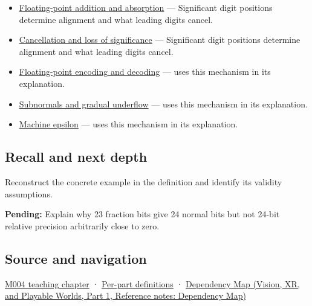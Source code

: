 \hypertarget{appendix-a24fd710cf67-used-by}{}

\begin{itemize}
\item
  \hyperref[appendix-a1b1b4580dfd]{Floating-point addition and absorption} --- Significant digit positions determine alignment and what leading digits cancel.
\item
  \hyperref[appendix-a2773a6a2f9d]{Cancellation and loss of significance} --- Significant digit positions determine alignment and what leading digits cancel.
\item
  \hyperref[appendix-6854d0e2218e]{Floating-point encoding and decoding} --- uses this mechanism in its explanation.
\item
  \hyperref[appendix-00a6e044c437]{Subnormals and gradual underflow} --- uses this mechanism in its explanation.
\item
  \hyperref[appendix-390ea641da54]{Machine epsilon} --- uses this mechanism in its explanation.
\end{itemize}

\subsection{Recall and next depth}\label{appendix-a24fd710cf67-recall-and-next-depth}

\hypertarget{appendix-a24fd710cf67-recall-and-next-depth}{}

Reconstruct the concrete example in the definition and identify its validity assumptions.

\textbf{Pending:} Explain why 23 fraction bits give 24 normal bits but not 24-bit relative precision arbitrarily close to zero.

\subsection{Source and navigation}\label{appendix-a24fd710cf67-source-and-navigation}

\hypertarget{appendix-a24fd710cf67-source-and-navigation}{}

\hyperref[01-foundations-i-ch001-a-stretching-ruler-for-real-valued-quantities]{M004 teaching chapter} · \hyperref[appendix-fd090d982a15-m004---parts-61-76]{Per-part definitions} · \href{../07-Vision-XR-and-Playable-Worlds-P01/main.pdf\#appendix-4ad47bdd269a}{Dependency Map (Vision, XR, and Playable Worlds, Part 1, Reference notes: Dependency Map)}
